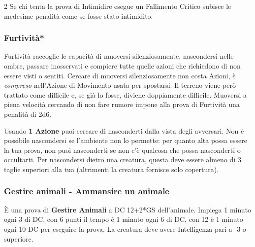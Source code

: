 \begin{multicols}{2}
Se chi tenta la prova di Intimidire esegue un Fallimento Critico subisce le medesime penalità come se fosse stato intimidito.


%

\titlespacing*{\subsubsection}{0pt}{0.5em}{0.5em}\subsubsection*{Furtività*}  \label{furtivita}

Furtività raccoglie le capacità di muoversi silenziosamente, nascondersi nelle ombre, passare inosservati e compiere tutte quelle azioni che richiedono di non essere visti o sentiti.
Cercare di muoversi silenziosamente non costa Azioni, è \emph{compreso} nell'Azione di Movimento usata per spostarsi. Il terreno viene però trattato come difficile e, se già lo fosse, diviene doppiamente difficile. Muoversi a piena velocità cercando di non fare rumore impone alla prova di Furtività una penalità di 2d6.

Usando \textbf{1 Azione} puoi cercare di nasconderti dalla vista degli avversari. Non è possibile nascondersi se l'ambiente non lo permette: per quanto alta possa essere la tua prova, non puoi nasconderti se non c'è qualcosa che possa nasconderti o occultarti. Per nascondersi dietro una creatura, questa deve essere almeno di 3 taglie superiori alla tua (altrimenti la creatura fornisce solo copertura).

\titlespacing*{\subsubsection}{0pt}{0.5em}{0.5em}\subsubsection*{Gestire animali - Ammansire un animale}\label{gestireanimali}
È una prova di \textbf{Gestire Animali} a DC 12+2*GS dell'animale. Impiega 1 minuto ogni 3 di DC, con 6 punti il tempo è 1 minuto ogni 6 di DC, con 12 è 1 minuto ogni 10 DC per eseguire la prova. La creatura deve avere Intelligenza pari a -3 o superiore.


\end{multicols}
